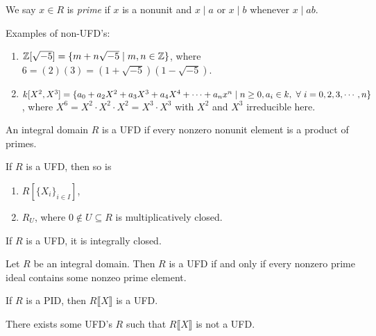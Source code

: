 \begin{definition}\label{1.76}
    We say $x \in R$ is \emph{prime} if $x$ is a nonunit and $x \mid a$ or $x \mid b$ whenever $x \mid ab$.
\end{definition}

\begin{example}\label{1.77}
    Examples of non-UFD's:
    \begin{enumerate}
        \item 
            $\mathbb{Z}[\sqrt{-5}] = \{m+n\sqrt{-5} \mid m,n \in \mathbb{Z}\}$, where $6 = (2)(3) = (1+\sqrt {-5})(1-\sqrt{-5})$.
        \item
            $k[X^{2},X^{3}] = \{a_0+a_2X^{2}+a_3X^{3}+a_4X^{4}+\cdots + a_nx^{n} \mid n \geq 0, a_i \in k,\ \forall \  i = 0,2,3,\cdots,n\}$, where $X^{6} = X^{2} \cdot X^{2} \cdot X^{2} = X^{3} \cdot X^{3}$ with $X^{2}$ and $X^{3}$ irreducible here.
    \end{enumerate}
\end{example}

\begin{definition}\label{1.78}
    An integral domain $R$ is a UFD if every nonzero nonunit element is a product of primes.
\end{definition}

\begin{theorem}\label{1.79}
    If $R$ is a UFD, then so is 
    \begin{enumerate}
        \item $R[\{X_i\}_{i \in I}]$,
        \item $R_U$, where $0 \not \in U \subseteq R$ is multiplicatively closed.
    \end{enumerate}
\end{theorem}

\begin{fact}\label{1.80}
    If $R$ is a UFD, it is integrally closed.
\end{fact}

\begin{theorem}\label{1.81}
    Let $R$ be an integral domain. Then $R$ is a UFD if and only if every nonzero prime ideal contains some nonzeo prime element.
\end{theorem}

\begin{theorem}\label{1.82}
    If $R$ is a PID, then $R\llbracket X \rrbracket$ is a UFD.
\end{theorem}

\begin{example}\label{1.83}
    There exists some UFD's $R$ such that $R\llbracket X \rrbracket $ is not a UFD.
\end{example}


